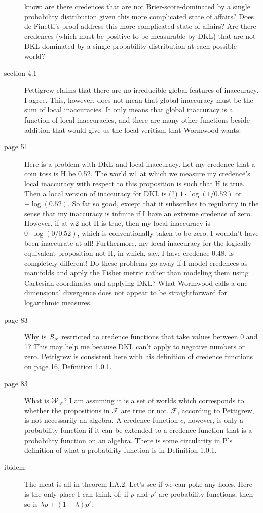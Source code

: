 \documentclass[12pt]{article}
\begin{document}
\begin{description}
  know: are there credences that are not Brier-score-dominated by a
  single probability distribution given this more complicated state of
  affairs? Does de Finetti's proof address this more complicated state
  of affairs? Are there credences (which must be positive to be
  measurable by DKL) that are not DKL-dominated by a single
  probability distribution at each possible world?
\item[section 4.1] Pettigrew claims that there are no irreducible
  global features of inaccuracy. I agree. This, however, does not mean
  that global inaccuracy must be the sum of local inaccuracies. It
  only means that global inaccuracy is a function of local
  inaccuracies, and there are many other functions beside addition
  that would give us the local veritism that Wormwood wants.
\item[page 51] Here is a problem with DKL and local inaccuracy. Let my
  credence that a coin toss is H be 0.52. The world w1 at which we
  measure my credence's local inaccuracy with respect to this
  proposition is such that H is true. Then a local version of
  inaccuracy for DKL is (?) $1\cdot\log(1/0.52)$ or $-\log(0.52)$. So
  far so good, except that it subscribes to regularity in the sense
  that my inaccuracy is infinite if I have an extreme credence of
  zero. However, if at w2 not-H is true, then my local inaccuracy is
  $0\cdot\log(0/0.52)$, which is conventionally taken to be zero. I
  wouldn't have been inaccurate at all! Furthermore, my local
  inaccuracy for the logically equivalent proposition not-H, in which,
  say, I have credence 0.48, is completely different! Do these
  problems go away if I model credences as manifolds and apply the
  Fisher metric rather than modeling them using Cartesian coordinates
  and applying DKL? What Wormwood calls a one-dimensional divergence
  does not appear to be straightforward for logarithmic measures.
\item[page 83] Why is $\mathcal{B}_{\mathcal{F}}$ restricted to credence
  functions that take values between 0 and 1? This may help me because
  DKL can't apply to negative numbers or zero. Pettigrew is consistent
  here with his definition of credence functions on page 16,
  Definition 1.0.1.
\item[page 83] What is $\mathcal{W}_{\mathcal{F}}$? I am assuming it is
  a set of worlds which corresponds to whether the propositions in
  $\mathcal{F}$ are true or not. $\mathcal{F}$, according to Pettigrew, is
  not necessarily an algebra. A credence function $c$, however, is
  only a probability function if it can be extended to a credence
  function that is a probability function on an algebra. There is some
  circularity in P's definition of what a probability function is in
  Definition 1.0.1.
\item[ibidem] The meat is all in theorem I.A.2. Let's see if we can
  poke any holes. Here is the only place I can think of: if $p$ and
  $p'$ are probability functions, then so is
  $\lambda{}p+(1-\lambda)p'$.
\end{description}
\end{document}
